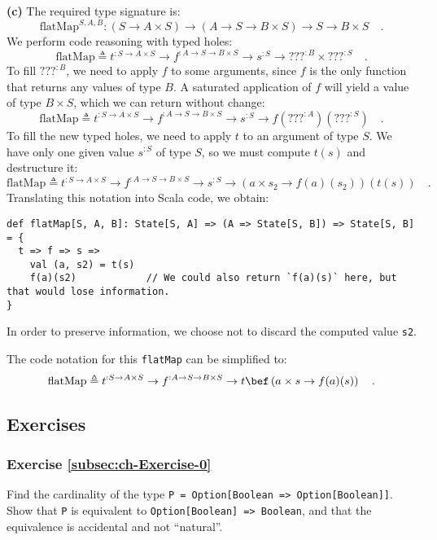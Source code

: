 \textbf{(c)} The required type signature is:
\[
\text{flatMap}^{S,A,B}:(S\rightarrow A\times S)\rightarrow(A\rightarrow S\rightarrow B\times S)\rightarrow S\rightarrow B\times S\quad.
\]
We perform code reasoning with typed holes:
\[
\text{flatMap}\triangleq t^{:S\rightarrow A\times S}\rightarrow f^{:A\rightarrow S\rightarrow B\times S}\rightarrow s^{:S}\rightarrow\text{???}^{:B}\times???^{:S}\quad.
\]
To fill $\text{???}^{:B}$, we need to apply $f$ to some arguments,
since $f$ is the only function that returns any values of type $B$.
A saturated application of $f$ will yield a value of type $B\times S$,
which we can return without change:
\[
\text{flatMap}\triangleq t^{:S\rightarrow A\times S}\rightarrow f^{:A\rightarrow S\rightarrow B\times S}\rightarrow s^{:S}\rightarrow f(\text{???}^{:A})(\text{???}^{:S})\quad.
\]
To fill the new typed holes, we need to apply $t$ to an argument
of type $S$. We have only one given value $s^{:S}$ of type $S$,
so we must compute $t(s)$ and destructure it:
\[
\text{flatMap}\triangleq t^{:S\rightarrow A\times S}\rightarrow f^{:A\rightarrow S\rightarrow B\times S}\rightarrow s^{:S}\rightarrow\left(a\times s_{2}\rightarrow f(a)(s_{2})\right)(t(s))\quad.
\]
Translating this notation into Scala code, we obtain:
\begin{lstlisting}
def flatMap[S, A, B]: State[S, A] => (A => State[S, B]) => State[S, B] = {
  t => f => s =>
    val (a, s2) = t(s)
    f(a)(s2)            // We could also return `f(a)(s)` here, but that would lose information.
}
\end{lstlisting}
In order to preserve information, we choose not to discard the computed
value \lstinline!s2!.

The code notation for this \lstinline!flatMap! can be simplified
to:
\[
\text{flatMap}\triangleq t^{:S\rightarrow A\times S}\rightarrow f^{:A\rightarrow S\rightarrow B\times S}\rightarrow t\bef\left(a\times s\rightarrow f(a)(s)\right)\quad.
\]


\subsection{Exercises}

\subsubsection{Exercise \label{subsec:ch-Exercise-0}\ref{subsec:ch-Exercise-0}}

Find the cardinality of the type \lstinline!P = Option[Boolean => Option[Boolean]]!.
Show that \lstinline!P! is equivalent to \lstinline!Option[Boolean] => Boolean!,
and that the equivalence is accidental
and not \textsf{``}natural\textsf{''}.

